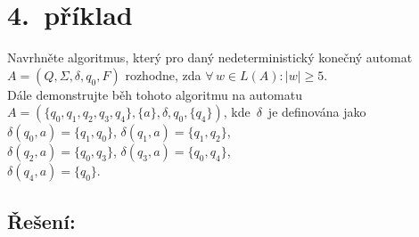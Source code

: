 \documentclass[a4paper, 11pt]{scrartcl}
\begin{document}
    \section*{4.~příklad}

    Navrhněte algoritmus, který pro daný nedeterministický konečný automat
    $ A = (Q, \Sigma, \delta, q_0, F) $ rozhodne, zda $ \forall\,w \in L(A):
    |w| \geq 5 $. \\[5pt]
    Dále demonstrujte běh tohoto algoritmu na automatu $ A = (\{q_0, q_1,
    q_2, q_3, q_4\}, \{a\}, \delta, q_0, \{q_4\}) $, kde~$ \delta $~je
    definována jako \\[5pt]
    $ \delta(q_0, a) = \{q_1, q_0\} $, $ \delta(q_1, a) = \{q_1, q_2\} $, \\
    $ \delta(q_2, a) = \{q_0, q_3\} $, $ \delta(q_3, a) = \{q_0, q_4\} $, \\
    $ \delta(q_4, a) = \{q_0\} $.

    \subsection*{Řešení:}
\end{document}

